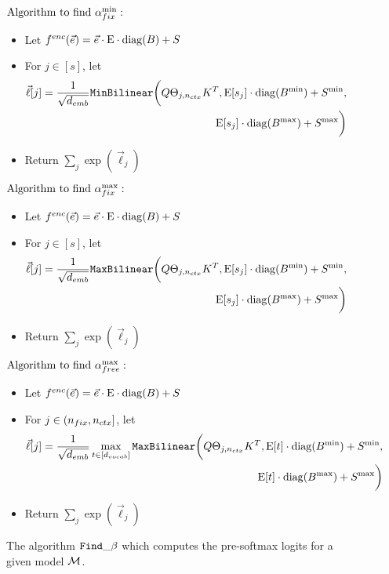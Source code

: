 \iffalse
\begin{figure}[H]
	\begin{mdframed}
		$\text{Algorithm to find }{\alpha}_{fix}^{\min}:$%
		\begin{itemize}
			\item Let $f^{enc}(\vec{e}) = \vec{e} \cdot \text{E} \cdot \mathrm{diag}(B) + S$
			\item For $j \in [s]$, let 
				\begin{align*}
					\vec{\ell}[j] = \frac{1}{\sqrt{{d_{emb}}}} 
					\texttt{MinBilinear}\bigg(Q \Theta_{j, {n_{ctx}}} K^T, \text{E}[{s}_j] \cdot \mathrm{diag}(B^{\min}) + S^{\min}, \\
					\text{E}[{s}_j] \cdot \mathrm{diag}(B^{\max}) + S^{\max} \bigg)
				\end{align*}
			\item Return $\sum_j \exp\left(\vec{\ell}_j\right)$
		\end{itemize}
		$\text{Algorithm to find }{\alpha}_{fix}^{\max}:$%
		\begin{itemize}
			\item Let $f^{enc}(\vec{e}) = \vec{e} \cdot \text{E} \cdot \mathrm{diag}(B) + S$
			\item For $j \in [s]$, let 
				\begin{align*}
					\vec{\ell}[j] = \frac{1}{\sqrt{{d_{emb}}}} 
					\texttt{MaxBilinear}\bigg(Q \Theta_{j, {n_{ctx}}} K^T, \text{E}[{s}_j] \cdot \mathrm{diag}(B^{\min}) + S^{\min}, \\
					\text{E}[{s}_j] \cdot \mathrm{diag}(B^{\max}) + S^{\max} \bigg)
				\end{align*}
			\item Return $\sum_j \exp\left(\vec{\ell}_j\right)$
		\end{itemize}
		$\text{Algorithm to find }{\alpha}_{free}^{\max}:$%
		\begin{itemize}
			\item Let $f^{enc}(\vec{e}) = \vec{e} \cdot \text{E} \cdot \mathrm{diag}(B) + S$
			\item For $j \in (n_{fix}, {n_{ctx}}]$, let 
				\begin{align*}
					\vec{\ell}[j] = \frac{1}{\sqrt{{d_{emb}}}} \max_{t \in [{d_{vocab}}]} 
					\texttt{MaxBilinear}\bigg(Q \Theta_{j, {n_{ctx}}} K^T, \text{E}[t] \cdot \mathrm{diag}(B^{\min}) + S^{\min}, \\
					\text{E}[t] \cdot \mathrm{diag}(B^{\max}) + S^{\max} \bigg)
				\end{align*}
			\item Return $\sum_j \exp\left(\vec{\ell}_j\right)$
		\end{itemize}

	\end{mdframed}
	\caption{The algorithm $\texttt{Find}\_\beta$ which computes the pre-softmax logits for a given model $\mathcal{M}$.
	}
	\label{fig:find_ell_alg}
\end{figure}

